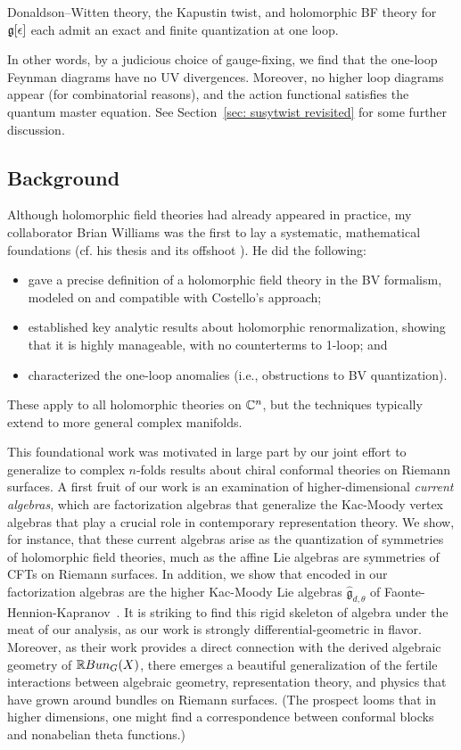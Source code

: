 \documentclass[11pt]{amsart}
\def\g{{\mathfrak g}}
\def\owen#1{{\textcolor{green!65!black}{BRW: {#1}}}}
\begin{document}
\begin{thm}[\owen{cite GRW, maybe also mention our work with Chris?}]
Donaldson--Witten theory, the Kapustin twist, and holomorphic BF theory for $\mathfrak g[\epsilon]$ each admit an exact and finite quantization at one loop.
\end{thm}

In other words, by a judicious choice of gauge-fixing, 
we find that the one-loop Feynman diagrams have no UV divergences.
Moreover, no higher loop diagrams appear (for combinatorial reasons),
and the action functional satisfies the quantum master equation.
See Section~\ref{sec: susytwist revisited} for some further discussion.



\subsection{Background}

Although holomorphic field theories had already appeared in practice,
my collaborator Brian Williams was the first to lay a systematic, mathematical foundations (cf. his thesis \cite{BWthesis} and its offshoot \cite{BWhol}).
He did the following:
\begin{itemize}
\item gave a precise definition of a holomorphic field theory in the BV formalism,
modeled on and compatible with Costello's approach;
\item established key analytic results about holomorphic renormalization, 
showing that it is highly manageable, with no counterterms to 1-loop; and
\item characterized the one-loop anomalies  (i.e., obstructions to BV quantization).
\end{itemize}
These apply to all holomorphic theories on $\mathbb C^n$,
but the techniques typically extend to more general complex manifolds.

This foundational work was motivated in large part by our joint effort to generalize to complex $n$-folds results about chiral conformal theories on Riemann surfaces.
A first fruit of our work \cite{GWcurr} is an examination of higher-dimensional {\em current algebras},
which are factorization algebras that generalize the Kac-Moody vertex algebras that play a crucial role in contemporary representation theory.
We show, for instance, that these current algebras arise as the quantization of symmetries of holomorphic field theories, 
much as the affine Lie algebras are symmetries of CFTs on Riemann surfaces.
In addition, we show that encoded in our factorization algebras are the higher Kac-Moody Lie algebras $\widehat{\g}_{d,\theta}$ of Faonte-Hennion-Kapranov~\cite{FHK}. 
It is striking to find this rigid skeleton of algebra under the meat of our analysis,
as our work is strongly differential-geometric in flavor.
Moreover, as their work provides a direct connection with the derived algebraic geometry of $\mathbb R Bun_G(X)$,
there emerges a beautiful generalization of the fertile interactions between algebraic geometry, representation theory, and physics that have grown around bundles on Riemann surfaces.
(The prospect looms that in higher dimensions,
one might find a correspondence between conformal blocks and nonabelian theta functions.)
\end{document}
